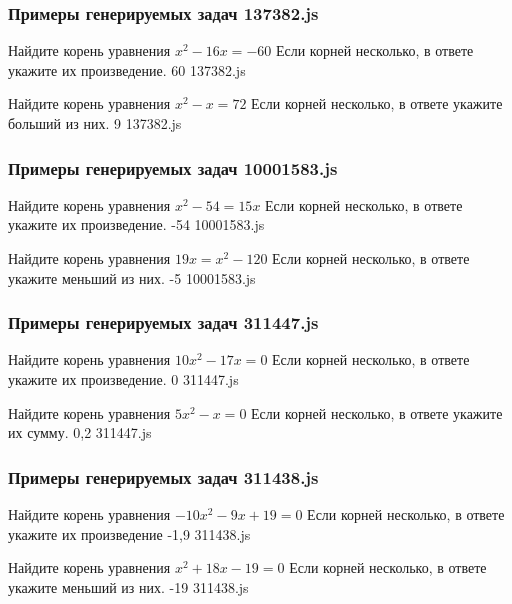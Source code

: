 
\subsubsection*{Примеры генерируемых задач 137382.js}   

\par{Найдите корень уравнения $x^2−16x=−60$ Если корней несколько, в ответе укажите их произведение. }{ 60 }{137382.js}
\par{Найдите корень уравнения $x^2−x=72$ Если корней несколько, в ответе укажите больший из них. }{ 9 }{137382.js}


\subsubsection*{Примеры генерируемых задач 10001583.js}   

\par{Найдите корень уравнения $x^2−54=15x$ Если корней несколько, в ответе укажите их произведение. }{ -54 }{10001583.js}
\par{Найдите корень уравнения $19x=x^2−120$ Если корней несколько, в ответе укажите меньший из них. }{ -5 }{10001583.js}


\subsubsection*{Примеры генерируемых задач 311447.js}   

\par{Найдите корень уравнения $10x^2−17x=0$ Если корней несколько, в ответе укажите их произведение. }{ 0 }{311447.js}
\par{Найдите корень уравнения $5x^2−x=0$ Если корней несколько, в ответе укажите их сумму. }{ 0,2 }{311447.js}


\subsubsection*{Примеры генерируемых задач 311438.js}   

\par{Найдите корень уравнения $−10x^2−9x+19=0$ Если корней несколько, в ответе укажите их произведение }{ -1,9 }{311438.js}
\par{Найдите корень уравнения $x^2+18x−19=0$ Если корней несколько, в ответе укажите меньший из них. }{ -19 }{311438.js}

